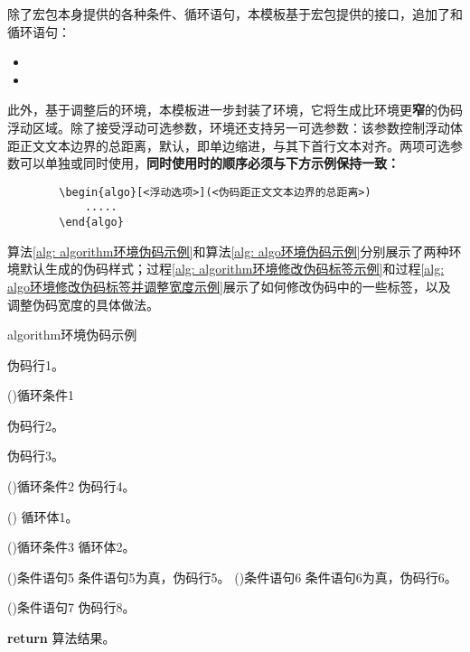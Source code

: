\documentclass[doctor, vlined]{DissertUESTC}
\begin{document}
	除了\href{https://mirrors.sustech.edu.cn/CTAN/macros/latex/contrib/algorithm2e/doc/algorithm2e.pdf}{\ttfamily\color{DarkRed}}宏包本身提供的各种条件、循环语句，本模板基于宏包提供的接口，追加了和循环语句：
	\begin{itemize}
		\item {}
		\item {}
	\end{itemize}
	
	
	此外，基于调整后的环境，本模板进一步封装了环境，它将生成比环境更\textbf{窄}的伪码浮动区域。除了接受浮动可选参数\shad{[htbp]}，环境还支持另一可选参数：该参数控制浮动体距正文文本边界的总距离，默认\shad{4em}，即单边缩进\shad{2em}，与其下首行文本对齐。两项可选参数可以单独或同时使用，\textbf{同时使用时的顺序必须与下方示例保持一致：}
	
	\begin{verbatim}
		\begin{algo}[<浮动选项>](<伪码距正文文本边界的总距离>)
		    .....
		\end{algo}
	\end{verbatim}
	
	算法\ref{alg: algorithm环境伪码示例}和算法\ref{alg: algo环境伪码示例}分别展示了两种环境默认生成的伪码样式；过程\ref{alg: algorithm环境修改伪码标签示例}和过程\ref{alg: algo环境修改伪码标签并调整宽度示例}展示了如何修改伪码中的一些标签，以及调整伪码宽度的具体做法。

	
	\begin{algorithm}[!h]
		\caption{algorithm环境伪码示例} \label{alg: algorithm环境伪码示例}
		伪码行1。
		
		\For(){循环条件1}{
			伪码行2。
			
			伪码行3。
			
			\DoWhile(){循环条件2}{
				伪码行4。
			}
			
			\Loop(){
				循环体1。
			}
			
			\Repeat(){循环条件3}{
				循环体2。
			}
			
			\uIf(){条件语句5}{
				条件语句5为真，伪码行5。
			}
			\uElseIf(){条件语句6}{
				条件语句6为真，伪码行6。
			}
			
			\If(){条件语句7}{
				伪码行8。
			}
		}
		\textbf{return} 算法结果。
	\end{algorithm}
	
\end{document}
